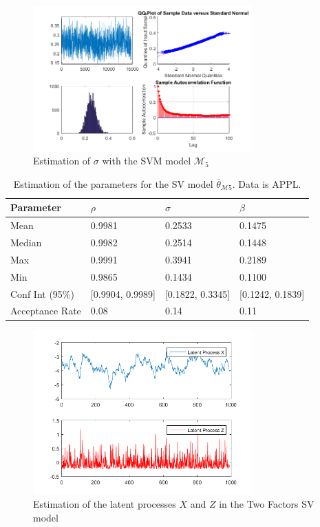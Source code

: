 \documentclass[11pt,a4,twosided,singlespacing,titlepagenumber=on]{scrreprt}
\numberwithin{equation}{chapter} %
\theoremstyle{remark}
\begin{document}
\begin{figure}[H]
\centering
\includegraphics[width = 0.75\textwidth]{sigma_svm}
\caption{Estimation of $\sigma$ with the SVM model $\mathcal{M}_5$}
\label{sigma_svm}
\end{figure}


\begin{table}[H]
\centering
\begin{tabular}{llll}
\label{marginal_log_lik_appl}
Parameter    		& $\rho$ & $\sigma$ & $\beta$ \\ 
\hline
Mean            & 0.9981              & 0.2533             & 0.1475\\
Median          & 0.9982              & 0.2514             & 0.1448\\
Max             & 0.9991              & 0.3941             & 0.2189\\
Min             & 0.9865              & 0.1434             & 0.1100\\
Conf Int (95\%) & [0.9904, 0.9989]    & [0.1822, 0.3345]   & [0.1242, 0.1839]\\
Acceptance Rate & 0.08                & 0.14               & 0.11 \\
\hline
\end{tabular}
\caption{Estimation of the parameters for the SV model $\bar{\theta}_{\mathcal{M}5}$. Data is APPL.}
\end{table}

\begin{figure}[H]
\centering
\includegraphics[width = 0.75\textwidth]{appl_twofactors_latent_processes}
\caption{Estimation of the latent processes $X$ and $Z$ in the Two Factors SV model}
\label{appl_twofactors_latent_processes}
\end{figure}
\end{document}
